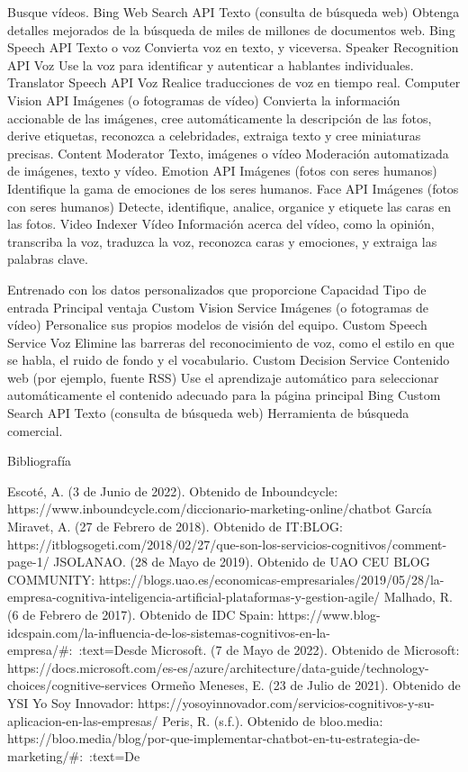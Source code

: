 Busque vídeos.
Bing Web Search API
Texto (consulta de búsqueda web)
Obtenga detalles mejorados de la búsqueda de miles de millones de documentos web.
Bing Speech API
Texto o voz
Convierta voz en texto, y viceversa.
Speaker Recognition API
Voz
Use la voz para identificar y autenticar a hablantes individuales.
Translator Speech API
Voz
Realice traducciones de voz en tiempo real.
Computer Vision API
Imágenes (o fotogramas de vídeo)
Convierta la información accionable de las imágenes, cree automáticamente la descripción de las fotos, derive etiquetas, reconozca a celebridades, extraiga texto y cree miniaturas precisas.
Content Moderator
Texto, imágenes o vídeo
Moderación automatizada de imágenes, texto y vídeo.
Emotion API
Imágenes (fotos con seres humanos)
Identifique la gama de emociones de los seres humanos.
Face API
Imágenes (fotos con seres humanos)
Detecte, identifique, analice, organice y etiquete las caras en las fotos.
Video Indexer
Vídeo
Información acerca del vídeo, como la opinión, transcriba la voz, traduzca la voz, reconozca caras y emociones, y extraiga las palabras clave.


Entrenado con los datos personalizados que proporcione
Capacidad
Tipo de entrada
Principal ventaja
Custom Vision Service
Imágenes (o fotogramas de vídeo)
Personalice sus propios modelos de visión del equipo.
Custom Speech Service
Voz
Elimine las barreras del reconocimiento de voz, como el estilo en que se habla, el ruido de fondo y el vocabulario.
Custom Decision Service
Contenido web (por ejemplo, fuente RSS)
Use el aprendizaje automático para seleccionar automáticamente el contenido adecuado para la página principal
Bing Custom Search API
Texto (consulta de búsqueda web)
Herramienta de búsqueda comercial.





Bibliografía

Escoté, A. (3 de Junio de 2022). Obtenido de Inboundcycle: https://www.inboundcycle.com/diccionario-marketing-online/chatbot
García Miravet, A. (27 de Febrero de 2018). Obtenido de IT:BLOG: https://itblogsogeti.com/2018/02/27/que-son-los-servicios-cognitivos/comment-page-1/
JSOLANAO. (28 de Mayo de 2019). Obtenido de UAO CEU BLOG COMMUNITY: https://blogs.uao.es/economicas-empresariales/2019/05/28/la-empresa-cognitiva-inteligencia-artificial-plataformas-y-gestion-agile/
Malhado, R. (6 de Febrero de 2017). Obtenido de IDC Spain: https://www.blog-idcspain.com/la-influencia-de-los-sistemas-cognitivos-en-la-empresa/\#:~:text=Desde%
Microsoft. (7 de Mayo de 2022). Obtenido de Microsoft: https://docs.microsoft.com/es-es/azure/architecture/data-guide/technology-choices/cognitive-services
Ormeño Meneses, E. (23 de Julio de 2021). Obtenido de YSI Yo Soy Innovador: https://yosoyinnovador.com/servicios-cognitivos-y-su-aplicacion-en-las-empresas/
Peris, R. (s.f.). Obtenido de bloo.media: https://bloo.media/blog/por-que-implementar-chatbot-en-tu-estrategia-de-marketing/\#:~:text=De%





